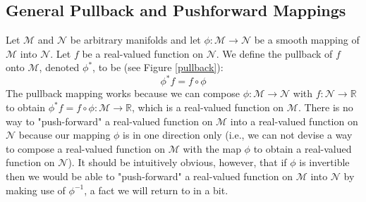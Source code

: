 \documentclass[10pt]{article}
\begin{document}
     \subsection{General Pullback and Pushforward Mappings}
Let $\mathcal{M}$ and $\mathcal{N}$ be arbitrary manifolds and let $\phi : \mathcal{M} \longrightarrow \mathcal{N}$ be a smooth mapping of $\mathcal{M}$ into $\mathcal{N}$.  Let $f$ be a real-valued function on $\mathcal{N}$.  We define the pullback of $f$ onto $\mathcal{M}$, denoted $\phi^\ast$, to be (see Figure \ref{pullback}):
\begin{equation}
\label{pullback function equation}
   \phi^\ast f = f\circ \phi
\end{equation}
The pullback mapping works because we can compose $\phi : \mathcal{M} \longrightarrow \mathcal{N}$ with $f : \mathcal{N} \longrightarrow \mathbb{R}$ to obtain $\phi^\ast f =f\circ \phi: \mathcal{M} \longrightarrow \mathbb{R}$, which is a real-valued function on $\mathcal{M}$.  There is no way to "push-forward" a real-valued function on $\mathcal{M}$ into a real-valued function on $\mathcal{N}$ because our mapping $\phi$ is in one direction only (i.e., we can not devise a way to compose a real-valued function on $\mathcal{M}$ with the map $\phi$ to obtain a real-valued function on $\mathcal{N}$).  It should be intuitively obvious, however, that if $\phi$ is invertible then we would be able to "push-forward" a real-valued function on $\mathcal{M}$ into $\mathcal{N}$ by making use of $\phi^{-1}$, a fact we will return to in a bit.  
\end{document}
